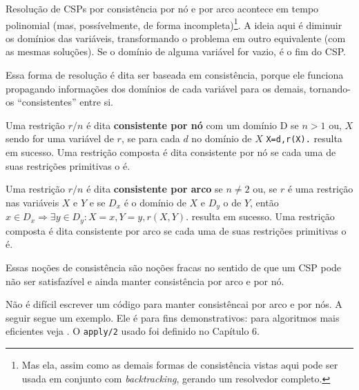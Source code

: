 \documentclass{article}
\begin{document}
Resolução de CSPs por consistência por nó e por arco acontece em tempo polinomial
(mas, possívelmente, de forma incompleta)\footnote{Mas ela, assim como as demais formas de consistência vistas aqui
 pode ser usada em conjunto com \textit{backtracking}, gerando um resolvedor completo.}.
A ideia aqui é diminuir os domínios das variáveis,
transformando o problema em outro equivalente (com as mesmas soluções).
Se o domínio de alguma variável for vazio, é o fim do CSP.

Essa forma de resolução é dita ser baseada em consistência, porque ele
funciona propagando informações dos domínios de cada variável para
os demais, tornando-os ``consistentes'' entre si.

\begin{definition}
  Uma restrição $r/n$ é dita \textbf{consistente por nó} com um domínio D
  se $n > 1$ ou, $X$ sendo for uma variável de $r$, se para cada $d$ no domínio
  de $X$ {\tt  X=d,r(X).} resulta em sucesso.
  Uma restrição composta é dita consistente por nó se cada uma de suas restrições
  primitivas o é.
\end{definition}

\begin{definition}
  Uma restrição $r/n$ é dita \textbf{consistente por arco} se
  $n \neq 2$ ou, se $r$ é uma restrição nas variáveis $X$ e $Y$ e se $D_x$ é o domínio de $X$ e $D_y$ o
  de $Y$, então $x \in D_x \Rightarrow \exists y \in D_y : X=x, Y=y, r(X,Y).$ resulta em sucesso.
  Uma restrição composta é dita consistente por arco se cada uma de suas restrições primitivas o é.
\end{definition}

Essas noções de consistência são noções fracas no sentido de que um CSP pode não ser satisfazível
e ainda manter consistência por arco e por nó.

Não é difícil escrever um código para manter consistêncai por arco e por nós. A seguir segue um exemplo. Ele é para fins
demonstrativos: para algoritmos mais eficientes veja \cite{tsang}. O {\tt apply/2} usado foi definido no Capítulo 6.

\label{lst:no_consistency}
\vspace{2cm}

\label{lst:arc_consistency}
\end{document}
